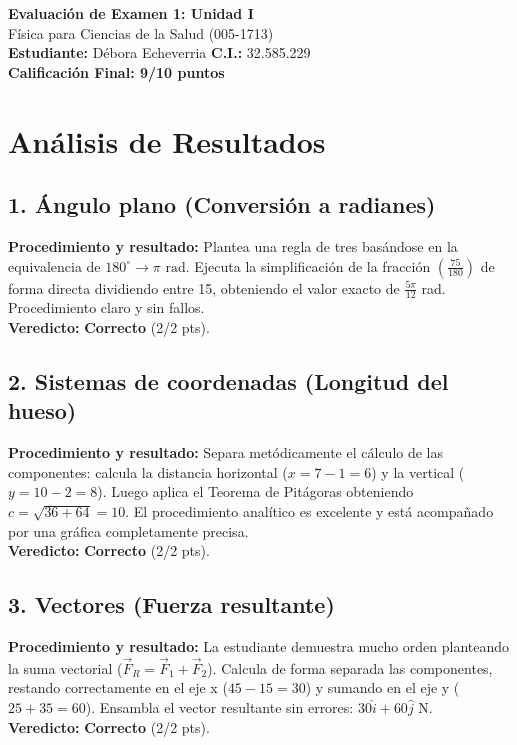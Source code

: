 \documentclass[12pt]{article}
\begin{document}
\begin{center}
    \Large \textbf{Evaluación de Examen 1: Unidad I} \\
    \large Física para Ciencias de la Salud (005-1713) \\
    \vspace{0.5cm}
    \textbf{Estudiante:} Débora Echeverria \quad \textbf{C.I.:} 32.585.229
    \vspace{0.3cm} \\
    \large \textbf{Calificación Final: 9/10 puntos}
\end{center}

\vspace{0.5cm}

\section*{Análisis de Resultados}

\subsection*{1. Ángulo plano (Conversión a radianes)}
\textbf{Procedimiento y resultado:} Plantea una regla de tres basándose en la equivalencia de $180^\circ \rightarrow \pi \text{ rad}$. Ejecuta la simplificación de la fracción $\left(\frac{75}{180}\right)$ de forma directa dividiendo entre 15, obteniendo el valor exacto de $\frac{5\pi}{12}$ rad. Procedimiento claro y sin fallos. \\
\textbf{Veredicto:} \textbf{Correcto} (2/2 pts).

\subsection*{2. Sistemas de coordenadas (Longitud del hueso)}
\textbf{Procedimiento y resultado:} Separa metódicamente el cálculo de las componentes: calcula la distancia horizontal ($x = 7-1 = 6$) y la vertical ($y = 10-2 = 8$). Luego aplica el Teorema de Pitágoras obteniendo $c = \sqrt{36+64} = 10$. El procedimiento analítico es excelente y está acompañado por una gráfica completamente precisa. \\
\textbf{Veredicto:} \textbf{Correcto} (2/2 pts).

\subsection*{3. Vectores (Fuerza resultante)}
\textbf{Procedimiento y resultado:} La estudiante demuestra mucho orden planteando la suma vectorial ($\vec{F}_R = \vec{F}_1 + \vec{F}_2$). Calcula de forma separada las componentes, restando correctamente en el eje x ($45 - 15 = 30$) y sumando en el eje y ($25 + 35 = 60$). Ensambla el vector resultante sin errores: $30\hat{i} + 60\hat{j}$ N. \\
\textbf{Veredicto:} \textbf{Correcto} (2/2 pts).
\end{document}
